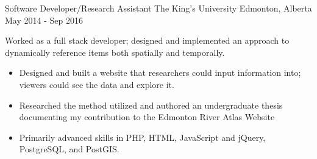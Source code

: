 \begin{cventries}
{\begin{itemize}
            \end{itemize}
        }
    \cventry
        {Software Developer/Research Assistant}
        {The King's University}
        {Edmonton, Alberta}
        {May 2014 - Sep 2016}
        {
            Worked as a full stack developer; designed and implemented an approach to dynamically reference items both spatially and temporally.
            \begin{itemize}
                \item Designed and built a website that researchers could input information into; viewers could see the data and explore it.
                \item Researched the method utilized and authored an undergraduate thesis documenting my contribution to the Edmonton River Atlas
                Website
                \item Primarily advanced skills in PHP, HTML, JavaScript and jQuery, PostgreSQL, and PostGIS.
            \end{itemize}
        }

\end{cventries}